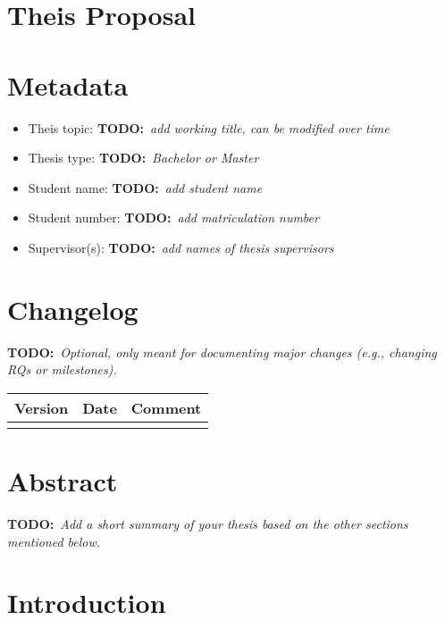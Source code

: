 \documentclass[pdftex,11pt,a4paper]{article}
\newcommand{\todo}[1]{{\textbf{TODO:}\ \textit{#1}}} %
\begin{document}
\section*{Theis Proposal}

\section{Metadata}

\begin{itemize}[itemsep=-1ex]
	\item Theis topic: \todo{add working title, can be modified over time}
	\item Thesis type: \todo{Bachelor or Master}
	\item Student name: \todo{add student name}
	\item Student number: \todo{add matriculation number}
	\item Supervisor(s): \todo{add names of thesis supervisors}
\end{itemize}


\section{Changelog}

\todo{Optional, only meant for documenting major changes (e.g., changing RQs or milestones).}

\begin{table}[ht]
\centering
\begin{tabular}{|l|l|l|}
\hline
\textbf{Version} & \textbf{Date} & \textbf{Comment} \\ \hline
 & & \\ \hline
\end{tabular}
\end{table}


\section{Abstract}

\todo{Add a short summary of your thesis based on the other sections mentioned below.}


\section{Introduction}
\end{document}
